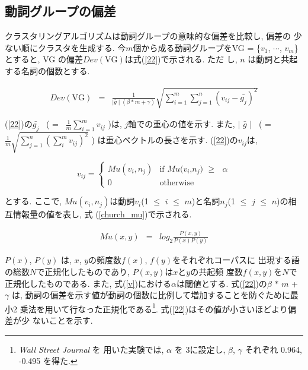 \subsection{動詞グループの偏差}

クラスタリングアルゴリズムは動詞グループの意味的な偏差を比較し, 偏差の
少ない順にクラスタを生成する.  今$m$個から成る動詞グループをVG = \{$v_{1}$,
$\cdots$, $v_{m}$\}とすると, VG の偏差$Dev(\mbox{VG})$は式(\ref{22})で示される.  ただ
し, $n$ は動詞と共起する名詞の個数とする.

\begin{eqnarray}
Dev(\mbox{VG}) & = &
\frac{1}{\mid\bar{g}\mid(\beta \ast m +
\gamma)}\sqrt{\sum_{i=1}^{m}\sum_{j=1}^{n}(v_{ij}-\bar{g_{j}})^{2}} \label{22}
\end{eqnarray}

\noindent
(\ref{22})の$\bar{g_{j}}$ \ \hspace{-0.3mm}( \hspace{-0.3mm}= \ \hspace{-0.3mm}$\frac{1}{m}\sum_{i=1}^{m} v_{ij}$ )は, $j$軸での重心の値を示す. また, $\mid$ $\bar{g}$ $\mid$ \ \hspace{-0.3mm}( \hspace{-0.5mm}= \ \hspace{-0.5mm}$\frac{1}{m}\sqrt{\sum_{j=1}^{n}(\sum_{i}^{m}v_{ij})^{2}}$ ) は重心ベクトルの長さを示す.  (\ref{22})の$v_{ij}$は,

\begin{equation}
v_{ij}  = \left\{ \begin{array}{ll}
	 Mu(v_{i},n_{j}) & \mbox{if $Mu$($v_{i}$,$n_{j}$) $\geq$ $\alpha$} \\
		 0 &\mbox{otherwise} 
	\end{array} \right. \label{v}
\end{equation}

\noindent
とする.  ここで, $Mu(v_{i},n_{j})$は動詞$v_{i}$(1 $\leq$ $i$ $\leq$
$m$)と名詞$n_{j}$(1 $\leq$ $j$ $\leq$ $n$)の相互情報量の値を表し, 式
(\ref{church_mu})で示される.

\begin{eqnarray}
Mu(x,y) & = & log_{2}\frac{P(x,y)}{P(x)P(y)} \label{church_mu}
\end{eqnarray}

\noindent
$P(x)$, $P(y)$ は, $x$, $y$の頻度数$f(x)$, $f(y)$をそれぞれコーパスに
出現する語の総数$N$で正規化したものであり, \hspace{0.1mm}$P(x,y)$は$x$\hspace{-0.1mm}と\hspace{-0.1mm}$y$の共起頻
度数$f(x,y)$を\hspace{-0.1mm}$N$\hspace{-0.1mm}で正規化したものである. また, 式(\ref{v})における$\alpha$は閾値とする.  式(\ref{22})の\hspace{-0.1mm}$\beta$ $\ast$ $m$ + $\gamma$ は, 
動詞の偏差を示す値が動詞の個数に比例して増加することを防ぐために最小2
乗法を用いて行なった正規化である\footnote{{\it Wall Street Journal} を
用いた実験では, $\alpha$ を 3に設定し, $\beta$, $\gamma$ それぞれ 
0.964, -0.495 を得た.}.  式(\ref{22})はその値が小さいほどより偏差が少
ないことを示す.


